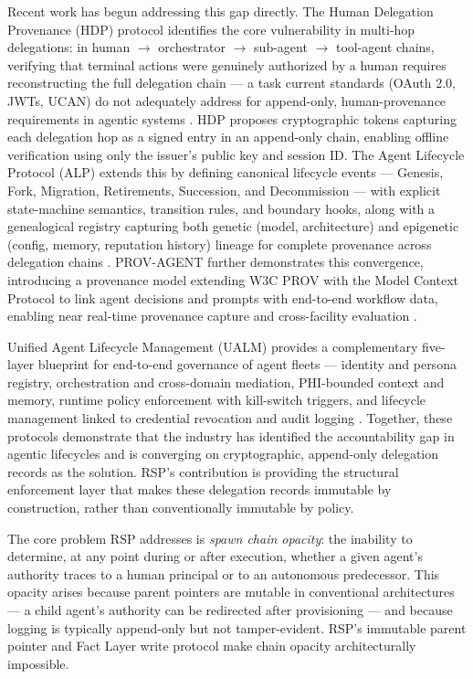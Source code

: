 Recent work has begun addressing this gap directly. The Human Delegation Provenance (HDP) protocol identifies the core vulnerability in multi-hop delegations: in human $\rightarrow$ orchestrator $\rightarrow$ sub-agent $\rightarrow$ tool-agent chains, verifying that terminal actions were genuinely authorized by a human requires reconstructing the full delegation chain --- a task current standards (OAuth 2.0, JWTs, UCAN) do not adequately address for append-only, human-provenance requirements in agentic systems \cite{hdp-draft, hdp-draft-2}. HDP proposes cryptographic tokens capturing each delegation hop as a signed entry in an append-only chain, enabling offline verification using only the issuer's public key and session ID. The Agent Lifecycle Protocol (ALP) extends this by defining canonical lifecycle events --- Genesis, Fork, Migration, Retirements, Succession, and Decommission --- with explicit state-machine semantics, transition rules, and boundary hooks, along with a genealogical registry capturing both genetic (model, architecture) and epigenetic (config, memory, reputation history) lineage for complete provenance across delegation chains \cite{alp2025}. PROV-AGENT further demonstrates this convergence, introducing a provenance model extending W3C PROV with the Model Context Protocol to link agent decisions and prompts with end-to-end workflow data, enabling near real-time provenance capture and cross-facility evaluation \cite{prov-agent2025}.

Unified Agent Lifecycle Management (UALM) provides a complementary five-layer blueprint for end-to-end governance of agent fleets --- identity and persona registry, orchestration and cross-domain mediation, PHI-bounded context and memory, runtime policy enforcement with kill-switch triggers, and lifecycle management linked to credential revocation and audit logging \cite{ualm2025}. Together, these protocols demonstrate that the industry has identified the accountability gap in agentic lifecycles and is converging on cryptographic, append-only delegation records as the solution. RSP's contribution is providing the structural enforcement layer that makes these delegation records immutable by construction, rather than conventionally immutable by policy.

The core problem RSP addresses is \emph{spawn chain opacity}: the inability to determine, at any point during or after execution, whether a given agent's authority traces to a human principal or to an autonomous predecessor. This opacity arises because parent pointers are mutable in conventional architectures --- a child agent's authority can be redirected after provisioning --- and because logging is typically append-only but not tamper-evident. RSP's immutable parent pointer and Fact Layer write protocol make chain opacity architecturally impossible.

